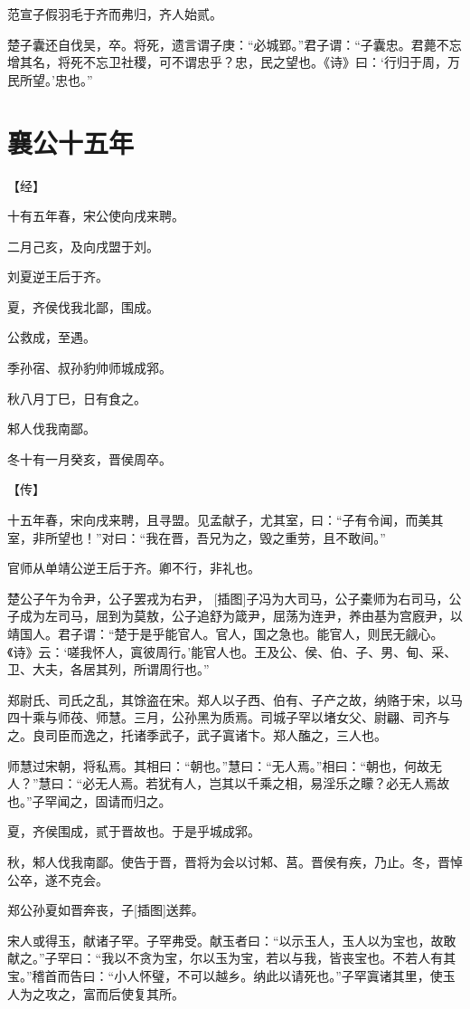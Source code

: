\documentclass[a4paper,12pt,UTF8,twoside]{ctexbook}
\begin{document}
范宣子假羽毛于齐而弗归，齐人始贰。

楚子囊还自伐吴，卒。将死，遗言谓子庚：“必城郢。”君子谓：“子囊忠。君薨不忘增其名，将死不忘卫社稷，可不谓忠乎？忠，民之望也。《诗》曰：‘行归于周，万民所望。’忠也。”

\chapter{襄公十五年}



【经】

十有五年春，宋公使向戌来聘。

二月己亥，及向戌盟于刘。

刘夏逆王后于齐。

夏，齐侯伐我北鄙，围成。

公救成，至遇。

季孙宿、叔孙豹帅师城成郛。

秋八月丁巳，日有食之。

邾人伐我南鄙。

冬十有一月癸亥，晋侯周卒。

【传】

十五年春，宋向戌来聘，且寻盟。见孟献子，尤其室，曰：“子有令闻，而美其室，非所望也！”对曰：“我在晋，吾兄为之，毁之重劳，且不敢间。”

官师从单靖公逆王后于齐。卿不行，非礼也。

楚公子午为令尹，公子罢戎为右尹， [插图]子冯为大司马，公子橐师为右司马，公子成为左司马，屈到为莫敖，公子追舒为箴尹，屈荡为连尹，养由基为宫廐尹，以靖国人。君子谓：“楚于是乎能官人。官人，国之急也。能官人，则民无觎心。《诗》云：‘嗟我怀人，寘彼周行。’能官人也。王及公、侯、伯、子、男、甸、采、卫、大夫，各居其列，所谓周行也。”

郑尉氏、司氏之乱，其馀盗在宋。郑人以子西、伯有、子产之故，纳赂于宋，以马四十乘与师茷、师慧。三月，公孙黑为质焉。司城子罕以堵女父、尉翩、司齐与之。良司臣而逸之，托诸季武子，武子寘诸卞。郑人醢之，三人也。

师慧过宋朝，将私焉。其相曰：“朝也。”慧曰：“无人焉。”相曰：“朝也，何故无人？”慧曰：“必无人焉。若犹有人，岂其以千乘之相，易淫乐之矇？必无人焉故也。”子罕闻之，固请而归之。

夏，齐侯围成，贰于晋故也。于是乎城成郛。

秋，邾人伐我南鄙。使告于晋，晋将为会以讨邾、莒。晋侯有疾，乃止。冬，晋悼公卒，遂不克会。

郑公孙夏如晋奔丧，子[插图]送葬。

宋人或得玉，献诸子罕。子罕弗受。献玉者曰：“以示玉人，玉人以为宝也，故敢献之。”子罕曰：“我以不贪为宝，尔以玉为宝，若以与我，皆丧宝也。不若人有其宝。”稽首而告曰：“小人怀璧，不可以越乡。纳此以请死也。”子罕寘诸其里，使玉人为之攻之，富而后使复其所。
\end{document}
